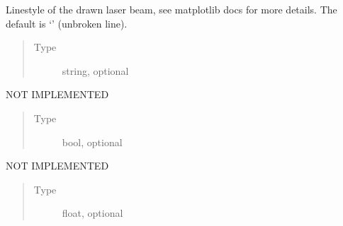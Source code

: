 \documentclass[letterpaper,10pt,english]{sphinxmanual}
\begin{document}
\begin{fulllineitems}
\begin{fulllineitems}
\begin{quote}
\begin{description}
\end{description}\end{quote}

\end{fulllineitems}


\begin{fulllineitems}
\label{\detokenize{index:pyopticaltable.LaserBeam.style}}
\sphinxAtStartPar
Linestyle of the drawn laser beam, see matplotlib docs for more details.
The default is ‘\sphinxhyphen{}’ (unbroken line).
\begin{quote}\begin{description}
\item[{Type}] \leavevmode
\sphinxAtStartPar
string, optional

\end{description}\end{quote}

\end{fulllineitems}


\begin{fulllineitems}
\label{\detokenize{index:pyopticaltable.LaserBeam.divergent}}
\sphinxAtStartPar
NOT IMPLEMENTED
\begin{quote}\begin{description}
\item[{Type}] \leavevmode
\sphinxAtStartPar
bool, optional

\end{description}\end{quote}

\end{fulllineitems}


\begin{fulllineitems}
\label{\detokenize{index:pyopticaltable.LaserBeam.divergence_angle}}
\sphinxAtStartPar
NOT IMPLEMENTED
\begin{quote}\begin{description}
\item[{Type}] \leavevmode
\sphinxAtStartPar
float, optional


\end{description}
\end{quote}
\end{fulllineitems}
\end{fulllineitems}
\end{document}
